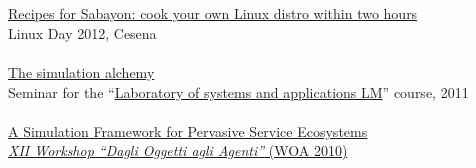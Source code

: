 \documentclass[10pt]{article}
\newcommand{\halfblankline}{\quad\vspace{-0.5\baselineskip}\pagebreak[3]}
\begin{document}
\\ \halfblankline \\
\href{https://www.slideshare.net/DanySK/recipes-for-sabayon-cook-your-own-linux-distro-within-two-hours}{Recipes for Sabayon: cook your own Linux distro within two hours} \\
Linux Day 2012, Cesena
\\ \halfblankline \\
\href{http://campus.unibo.it/83921/}{The simulation alchemy} \\
Seminar for the ``\href{http://apice.unibo.it/xwiki/bin/view/Courses/LsaLm1112}{Laboratory of systems and applications LM}'' course, 2011
\\ \halfblankline \\
\href{http://apice.unibo.it/xwiki/bin/view/Talks/PianiniWoa2011}{A Simulation Framework for Pervasive Service Ecosystems} \\
\href{http://www.inf.u-szeged.hu/projectdirs/saso10/}{\textit{XII Workshop ``Dagli Oggetti agli Agenti''} (WOA 2010)}
\end{document}
